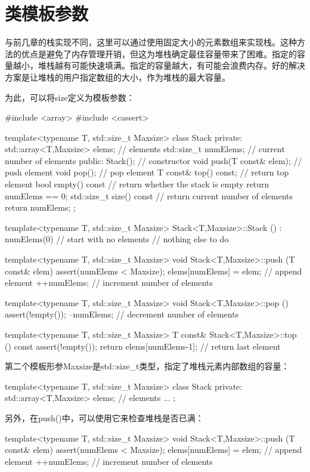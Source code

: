 \section{类模板参数}
与前几章的栈实现不同，这里可以通过使用固定大小的元素数组来实现栈。这种方法的优点是避免了内存管理开销，但这为堆栈确定最佳容量带来了困难。指定的容量越小，堆栈越有可能快速填满。指定的容量越大，有可能会浪费内存。好的解决方案是让堆栈的用户指定数组的大小，作为堆栈的最大容量。

为此，可以将size定义为模板参数：

\begin{cpp}
#include <array>
#include <cassert>

template<typename T, std::size_t Maxsize>
class Stack {
private:
	std::array<T,Maxsize> elems; // elements
	std::size_t numElems; // current number of elements
public:
	Stack(); // constructor
	void push(T const& elem); // push element
	void pop(); // pop element
	T const& top() const; // return top element
	bool empty() const { // return whether the stack is empty
		return numElems == 0;
	}
	std::size_t size() const { // return current number of elements
		return numElems;
	}
};

template<typename T, std::size_t Maxsize>
Stack<T,Maxsize>::Stack ()
: numElems(0) { // start with no elements
	// nothing else to do
}

template<typename T, std::size_t Maxsize>
void Stack<T,Maxsize>::push (T const& elem) {
	assert(numElems < Maxsize);
	elems[numElems] = elem; // append element
	++numElems; // increment number of elements
}

template<typename T, std::size_t Maxsize>
void Stack<T,Maxsize>::pop () {
	assert(!empty());
	--numElems; // decrement number of elements
}

template<typename T, std::size_t Maxsize>
T const& Stack<T,Maxsize>::top () const {
	assert(!empty());
	return elems[numElems-1]; // return last element
}
\end{cpp}

第二个模板形参Maxsize是std::size\_t类型，指定了堆栈元素内部数组的容量：

\begin{cpp}
template<typename T, std::size_t Maxsize>
class Stack {
private:
	std::array<T,Maxsize> elems; // elements
	...
};
\end{cpp}

另外，在push()中，可以使用它来检查堆栈是否已满：

\begin{cpp}
template<typename T, std::size_t Maxsize>
void Stack<T,Maxsize>::push (T const& elem) {
	assert(numElems < Maxsize);
	elems[numElems] = elem; // append element
	++numElems; // increment number of elements
}
\end{cpp}

